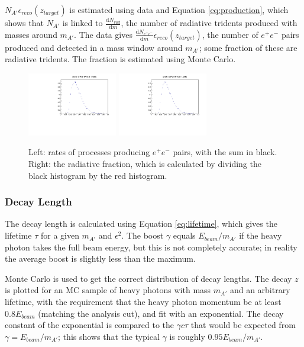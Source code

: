 $N_{A'}\epsilon_{reco}(z_{target})$ is estimated using data and Equation \ref{eq:production}, which shows that $N_{A'}$ is linked to $\frac{\mathrm{d}N_{rad}}{\mathrm{d}m}$, the number of radiative tridents produced with masses around $m_{A'}$.
The data gives $\frac{\mathrm{d}N_{e^+e^-}}{\mathrm{d}m}\epsilon_{reco}(z_{target})$, the number of $e^+e^-$ pairs produced and detected in a mass window around $m_{A'}$; some fraction of these are radiative tridents.
The fraction is estimated using Monte Carlo.

\begin{figure}[ht]
\begin{center}
    \includegraphics[width=0.35\textwidth,page=5,angle=-90]{vertexing/figs/frac}
    \includegraphics[width=0.35\textwidth,page=6,angle=-90]{vertexing/figs/frac}
\end{center}
    \caption{Left: rates of processes producing $e^+e^-$ pairs, with the sum in black. Right: the radiative fraction, which is calculated by dividing the black histogram by the red histogram.}
    \label{fig:radfrac}
\end{figure}

\subsubsection{Decay Length}
The decay length is calculated using Equation \ref{eq:lifetime}, which gives the lifetime $\tau$ for a given $m_{A'}$ and $\epsilon^2$.
The boost $\gamma$ equals $E_{beam}/m_{A'}$ if the heavy photon takes the full beam energy, but this is not completely accurate; in reality the average boost is slightly less than the maximum.

Monte Carlo is used to get the correct distribution of decay lengths.
The decay $z$ is plotted for an MC sample of heavy photons with mass $m_{A'}$ and an arbitrary lifetime, with the requirement that the heavy photon momentum be at least $0.8E_{beam}$ (matching the analysis cut), and fit with an exponential.
The decay constant of the exponential is compared to the $\gamma c \tau$ that would be expected from $\gamma=E_{beam}/m_{A'}$; this shows that the typical $\gamma$ is roughly $0.95E_{beam}/m_{A'}$.

